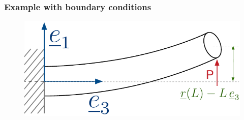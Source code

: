 \begin{frame}
  \frametitle{Example with boundary conditions}

  \begin{figure}
    \centering
    \includegraphics[width=14cm, keepaspectratio=true]{sections/cosserat_rods/images/MinimumPotentialEnergyMethodExample}
  \end{figure}
\end{frame}